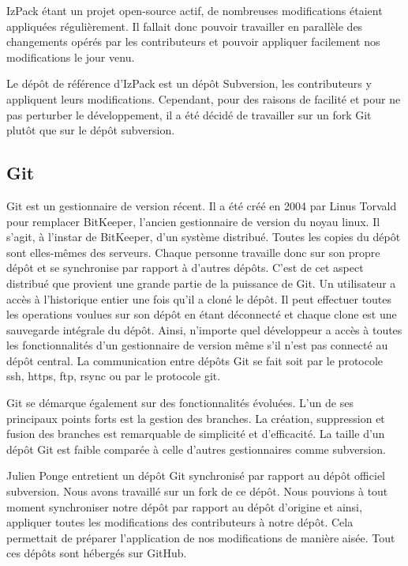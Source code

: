 IzPack étant un projet open-source actif, de nombreuses modifications étaient appliquées régulièrement.
Il fallait donc pouvoir travailler en parallèle des changements opérés par les contributeurs et pouvoir appliquer facilement nos modifications le jour venu.

Le dépôt de référence d'IzPack est un dépôt Subversion, les contributeurs y appliquent leurs modifications.
Cependant, pour des raisons de facilité et pour ne pas perturber le développement, il a été décidé de travailler sur un fork Git plutôt que sur le dépôt subversion.
\subsection{Git}
Git est un gestionnaire de version récent. Il a été créé en 2004 par Linus Torvald pour remplacer BitKeeper, l'ancien gestionnaire de version du noyau linux.
Il s'agit, à l'instar de BitKeeper, d'un système distribué.
Toutes les copies du dépôt sont elles-mêmes des serveurs.
Chaque personne travaille donc sur son propre dépôt et se synchronise par rapport à d'autres dépôts.
C'est de cet aspect distribué que provient une grande partie de la puissance de Git.
Un utilisateur a accès à l'historique entier une fois qu'il a cloné le dépôt.
Il peut effectuer toutes les operations voulues sur son dépôt en étant déconnecté et chaque clone est une sauvegarde intégrale du dépôt.
Ainsi, n'importe quel développeur a accès à toutes les fonctionnalités d'un gestionnaire de version même s'il n'est pas connecté au dépôt central.
La communication entre dépôts Git se fait soit par le protocole ssh, https, ftp, rsync ou par le protocole git.

Git se démarque également sur des fonctionnalités évoluées.
L'un de ses principaux points forts est la gestion des branches.
La création, suppression et fusion des branches est remarquable de simplicité et d'efficacité.
La taille d'un dépôt Git est faible comparée à celle d'autres gestionnaires comme subversion.

Julien Ponge entretient un dépôt Git synchronisé par rapport au dépôt officiel subversion.
Nous avons travaillé sur un fork de ce dépôt.
Nous pouvions à tout moment synchroniser notre dépôt par rapport au dépôt d'origine et ainsi, appliquer toutes les modifications des contributeurs à notre dépôt.
Cela permettait de préparer l'application de nos modifications de manière aisée. Tout ces dépôts sont hébergés sur GitHub.
